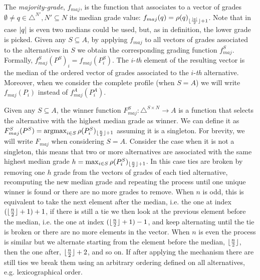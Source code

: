 The \emph{majority-grade}, $f_{maj}$, is the function that associates to a vector of grades $\emptyset \neq q \in \triangle^{N'}, N' \subseteq N$ its median grade value: $f_{maj}(q) = \rho(q)_{\lfloor\frac{\lvert q\rvert}{2}\rfloor + 1}$. Note that in case $\lvert q\rvert$ is even two medians could be used, but, as in \citet{Balinski2011} definition, the lower grade is picked. Given any $S\subseteq A$, by applying $f_{maj}$ to all vectors of grades associated to the alternatives in $S$ we obtain the corresponding grading function $f^S_{maj}$. Formally, $f^S_\mathit{maj}(P^S)_i = f_\mathit{maj}(P^S_i)$. The $i$-\emph{th} element of the resulting vector is the median of the ordered vector of grades associated to the $i$-\emph{th} alternative. 
Moreover, when we consider the complete profile (when $S=A$) we will write $f_{maj}(P_i)$ instead of $f^A_{maj}(P^A_i)$.

Given any $S\subseteq A$, the winner function $F^S_{maj}:\triangle^{S \times N} \rightarrow A$ %
is a function that selects the alternative with the highest median grade as winner. We can define it as $F^S_{maj}(P^S) = \operatorname*{argmax}_{i\in S}\rho(P^S_i)_{\lfloor\frac{n}{2}\rfloor+ 1}$ assuming it is a singleton. For brevity, we will write $F_{maj}$ when considering $S=A$. Consider the case when it is not a singleton, this means that two or more alternatives are associated with the same highest median grade $h=\max_{i\in S}\rho(P^S_i)_{\lfloor\frac{n}{2}\rfloor + 1}$. In this case ties are broken by removing one $h$ grade from the vectors of grades of each tied alternative, recomputing the new median grade and repeating the process until one unique winner is found or there are no more grades to remove. When $n$ is odd, this is equivalent to take the next element after the median, i.e. the one at index $(\lfloor\frac{n}{2}\rfloor + 1) +1$, if there is still a tie we then look at the previous element before the median, i.e. the one at index $(\lfloor\frac{n}{2}\rfloor + 1) -1$, and keep alternating until the tie is broken or there are no more elements in the vector. When $n$ is even the process is similar but we alternate starting from the element before the median, $\lfloor\frac{n}{2}\rfloor$, then the one after, $\lfloor\frac{n}{2}\rfloor + 2$, and so on.  If after applying the mechanism there are still ties we break them using an arbitrary ordering defined on all alternatives, e.g. lexicographical order.

